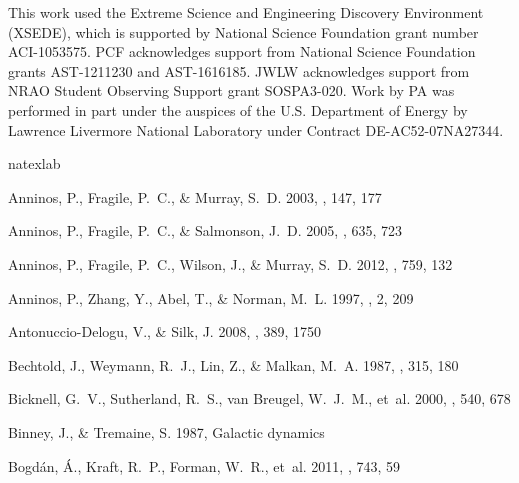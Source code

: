 \documentclass{aastex6}
\begin{document}
\acknowledgements
This work used the Extreme Science and Engineering Discovery Environment (XSEDE), which is supported by National Science Foundation grant number ACI-1053575.   PCF acknowledges support from National Science Foundation grants AST-1211230 and AST-1616185.  JWLW acknowledges support from NRAO Student Observing Support grant SOSPA3-020. Work by PA was performed in part under the auspices of the U.S. Department of Energy by Lawrence Livermore National Laboratory under Contract DE-AC52-07NA27344.


\begin{thebibliography}{}
\expandafter\ifx\csname natexlab\endcsname\relax\def\natexlab#1{#1}\fi

{Anninos}, P., {Fragile}, P.~C., \& {Murray}, S.~D. 2003, \apjs, 147, 177

{Anninos}, P., {Fragile}, P.~C., \& {Salmonson}, J.~D. 2005, \apj, 635, 723

{Anninos}, P., {Fragile}, P.~C., {Wilson}, J., \& {Murray}, S.~D. 2012, \apj,
  759, 132

{Anninos}, P., {Zhang}, Y., {Abel}, T., \& {Norman}, M.~L. 1997, \na, 2, 209

{Antonuccio-Delogu}, V., \& {Silk}, J. 2008, \mnras, 389, 1750

{Bechtold}, J., {Weymann}, R.~J., {Lin}, Z., \& {Malkan}, M.~A. 1987, \apj,
  315, 180

{Bicknell}, G.~V., {Sutherland}, R.~S., {van Breugel}, W.~J.~M., {et~al.} 2000,
  \apj, 540, 678

{Binney}, J., \& {Tremaine}, S. 1987, {Galactic dynamics}

{Bogd{\'a}n}, {\'A}., {Kraft}, R.~P., {Forman}, W.~R., {et~al.} 2011, \apj,
  743, 59


\end{thebibliography}
\end{document}
